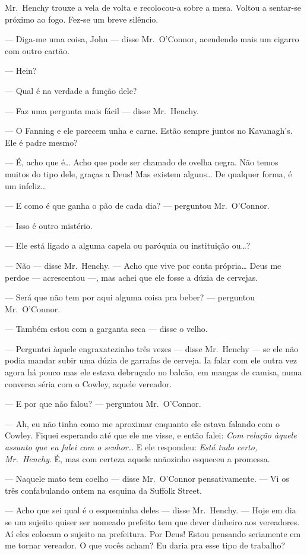 Mr.~Henchy trouxe a vela de volta e recolocou-a sobre a mesa.  Voltou a
sentar-se próximo ao fogo.  Fez-se um breve silêncio.

--- Diga-me uma coisa, John --- disse Mr.~O’Connor, acendendo mais um cigarro
com outro cartão.

--- Hein?

--- Qual é na verdade a função dele?

--- Faz uma pergunta mais fácil --- disse Mr.~Henchy.

--- O Fanning e ele parecem unha e carne.  Estão sempre juntos no Kavanagh’s.
Ele é padre mesmo?

--- É, acho que é\ldots{} Acho que pode ser chamado de ovelha negra.  Não temos
muitos do tipo dele, graças a Deus!  Mas existem alguns\ldots{} De qualquer
forma, é um infeliz\ldots{}

--- E como é que ganha o pão de cada dia? --- perguntou Mr.~O’Connor.

--- Isso é outro mistério.

--- Ele está ligado a alguma capela ou paróquia ou instituição ou\ldots{}?

--- Não --- disse Mr.~Henchy.  --- Acho que vive por conta própria\ldots{} Deus
me perdoe --- acrescentou ---, mas achei que ele fosse a dúzia de cervejas.

--- Será que não tem por aqui alguma coisa pra beber? --- perguntou Mr.~O’Connor.

--- Também estou com a garganta seca --- disse o velho.

--- Perguntei àquele engraxatezinho três vezes --- disse Mr.~Henchy --- se
ele não podia mandar subir uma dúzia de garrafas de cerveja.  Ia falar com ele
outra vez agora há pouco mas ele estava debruçado no balcão, em mangas de
camisa, numa conversa séria com o Cowley, aquele vereador.

--- E por que não falou? --- perguntou Mr.~O’Connor.

--- Ah, eu não tinha como me aproximar enquanto ele estava falando com o
Cowley.  Fiquei esperando até que ele me visse, e então falei: \textit{Com
relação àquele assunto que eu falei com o senhor}\ldots{} E ele
respondeu: \textit{Está tudo certo, Mr.~Henchy}.  É, mas com certeza
aquele anãozinho esqueceu a promessa.

--- Naquele mato tem coelho --- disse Mr.~O’Connor pensativamente.  --- Vi os
três confabulando ontem na esquina da Suffolk Street.

--- Acho que sei qual é o esqueminha deles --- disse Mr.~Henchy.  --- Hoje em
dia se um sujeito quiser ser nomeado prefeito tem que dever dinheiro aos
vereadores.  Aí eles colocam o sujeito na prefeitura.  Por Deus!  Estou
pensando seriamente em me tornar vereador.  O que vocês acham?  Eu daria pra
esse tipo de trabalho?

